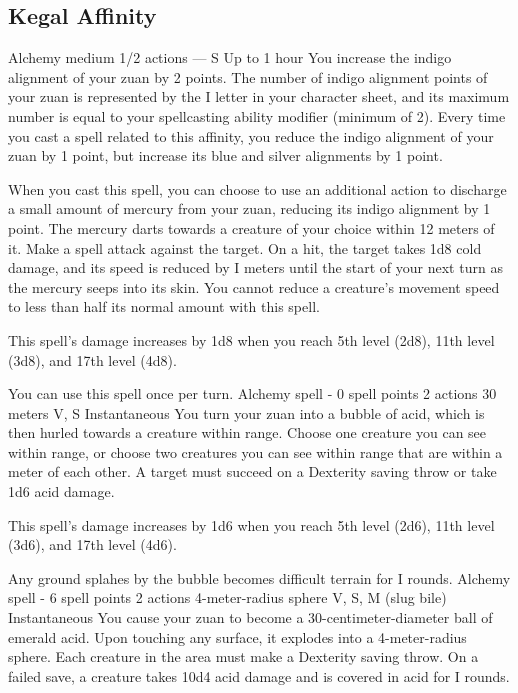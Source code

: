 \subsection*{Kegal Affinity}
        {Alchemy medium}
        {1/2 actions}
        {---}
        {S}
        {Up to 1 hour}
        You increase the indigo alignment of your zuan by 2 points.
        The number of indigo alignment points of your zuan is represented by the I letter in your character sheet, and its maximum number is equal to your spellcasting ability modifier (minimum of 2).
        Every time you cast a spell related to this affinity, you reduce the indigo alignment of your zuan by 1 point, but increase its blue and silver alignments by 1 point.

        When you cast this spell, you can choose to use an additional action to discharge a small amount of mercury from your zuan, reducing its indigo alignment by 1 point.
        The mercury darts towards a creature of your choice within 12 meters of it.
        Make a spell attack against the target.
        On a hit, the target takes 1d8 cold damage, and its speed is reduced by I meters until the start of your next turn as the mercury seeps into its skin.
        You cannot reduce a creature's movement speed to less than half its normal amount with this spell.

        This spell's damage increases by 1d8 when you reach 5th level (2d8), 11th level (3d8), and 17th level (4d8).

        You can use this spell once per turn.
        {Alchemy spell - 0 spell points}
        {2 actions}
        {30 meters}
        {V, S}
        {Instantaneous}
        You turn your zuan into a bubble of acid, which is then hurled towards a creature within range.
        Choose one creature you can see within range, or choose two creatures you can see within range that are within a meter of each other.
        A target must succeed on a Dexterity saving throw or take 1d6 acid damage.

        This spell's damage increases by 1d6 when you reach 5th level (2d6), 11th level (3d6), and 17th level (4d6).

        Any ground splahes by the bubble becomes difficult terrain for I rounds.
        {Alchemy spell - 6 spell points}
        {2 actions}
        {4-meter-radius sphere}
        {V, S, M (slug bile)}
        {Instantaneous}
        You cause your zuan to become a 30-centimeter-diameter ball of emerald acid.
        Upon touching any surface, it explodes into a 4-meter-radius sphere.
        Each creature in the area must make a Dexterity saving throw.
        On a failed save, a creature takes 10d4 acid damage and is covered in acid for I rounds.

